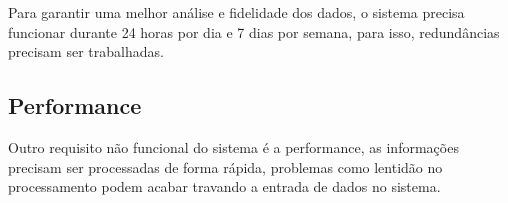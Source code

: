 Para garantir uma melhor análise e fidelidade dos dados, o sistema precisa funcionar durante 24 horas por dia e 7 dias por semana, para isso, redundâncias precisam ser trabalhadas.

\subsection{Performance}

Outro requisito não funcional do sistema é a performance, as informações precisam ser processadas de forma rápida, problemas como lentidão no processamento podem acabar travando a entrada de dados no sistema.
